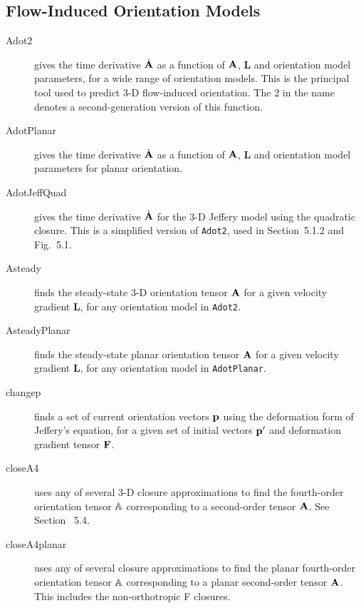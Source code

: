 \documentclass[11pt]{article}
\begin{document}
\subsection{Flow-Induced Orientation Models}

\begin{description}

    \item[Adot2]{gives the time derivative $\dot{\mathbf{A}}$ as a function of $\mathbf{A}$, $\mathbf{L}$ and orientation model parameters, for a wide range of orientation models.  This is the principal tool used to predict 3-D flow-induced orientation.  The 2 in the name denotes a second-generation version of this function.}
    
    \item[AdotPlanar]{gives the time derivative $\dot{\mathbf{A}}$ as a function of $\mathbf{A}$, $\mathbf{L}$ and orientation model parameters for planar orientation.}
    
    \item[AdotJeffQuad]{gives the time derivative $\dot{\mathbf{A}}$ for the 3-D Jeffery model using the quadratic closure.  This is a simplified version of \texttt{Adot2}, used in Section~5.1.2 and Fig.~5.1.}
    
    \item[Asteady]{finds the steady-state 3-D orientation tensor $\mathbf{A}$ for a given velocity gradient $\mathbf{L}$, for any orientation model in \texttt{Adot2}.}
    
    \item[AsteadyPlanar]{finds the steady-state planar orientation tensor $\mathbf{A}$ for a given velocity gradient $\mathbf{L}$, for any orientation model in \texttt{AdotPlanar}.}
    
    \item[changep]{finds a set of current orientation vectors $\mathbf{p}$ using the deformation form of Jeffery's equation, for a given set of initial vectors $\mathbf{p}'$ and deformation gradient tensor $\mathbf{F}$.}
    
    \item[closeA4]{uses any of several 3-D closure approximations to find the fourth-order orientation tensor $\mathbb{A}$ corresponding to a second-order tensor $\mathbf{A}$.  See Section~ 5.4.}  
    
    \item[closeA4planar]{uses any of several closure approximations to find the planar fourth-order orientation tensor $\mathbb{A}$ corresponding to a planar second-order tensor $\mathbf{A}$.  This includes the non-orthotropic F closures.}  
    

\end{description}
\end{document}
